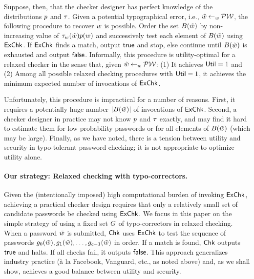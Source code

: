 Suppose, then, that the checker designer has perfect knowledge of the distributions $p$ and $\tau$. 
Given a potential typographical error, i.e., $\tilde{w} {\:\leftarrow_{{w}}\:} \mathcal{PW}$, the following procedure to recover ${w}$ is possible. Order the set $B(\tilde{w})$ by non-increasing value of $\tau_{{w}}(\tilde{w})p({w})$ and successively test each element of $B(\tilde{w})$ using $\textnormal{\textsf{ExChk}}$. If
$\textnormal{\textsf{ExChk}}$ finds a match, output $\textsf{true}$ and stop, else continue
until $B(\tilde{w})$ is exhausted and output $\textsf{false}$. Informally, this procedure is utility-optimal for a relaxed checker in the sense that, given $\tilde{w} {\:\leftarrow_{{w}}\:} \mathcal{PW}$: (1) It achieves $\textnormal{\textsf{Util}} = 1$ and (2) Among all possible relaxed checking procedures with $\textnormal{\textsf{Util}} = 1$, it achieves the minimum expected number of invocations of $\textnormal{\textsf{ExChk}}$.

Unfortunately, this procedure is impractical for a number of reasons. First, it requires a potentially huge number $|B(\tilde{w})|$ of 
invocations of $\textnormal{\textsf{ExChk}}$. Second, a checker designer in practice may not know $p$ and $\tau$ exactly, and may find it hard to estimate them for low-probability passwords or for all elements of $B(\tilde{w})$ (which may be large). Finally, as we have noted, there is a tension between utility and security in typo-tolerant password checking; it is not appropriate to optimize utility alone.

\paragraph{Our strategy: Relaxed checking with typo-correctors.} Given the (intentionally imposed) high computational burden of invoking $\textnormal{\textsf{ExChk}}$, achieving a practical checker design requires that only a relatively small set of candidate passwords be checked using $\textnormal{\textsf{ExChk}}$. We focus in this paper on the simple strategy of using a fixed set $G$ of typo-correctors in relaxed checking. When a password $\tilde{w}$ is submitted, $\textnormal{\textsf{Chk}}$ uses $\textnormal{\textsf{ExChk}}$ to test the sequence of passwords $g_0(\tilde{w}), g_1(\tilde{w}), \ldots, g_{c-1}(\tilde{w})$ in order. If a match is found, $\textnormal{\textsf{Chk}}$ outputs $\textsf{true}$ and halts. If all checks fail, it outputs $\textsf{false}$. This approach generalizes industry practice (\`{a} la Facebook, Vanguard, etc., as noted above) and, as we shall show, achieves a good balance between utility and security. 
\fi 






